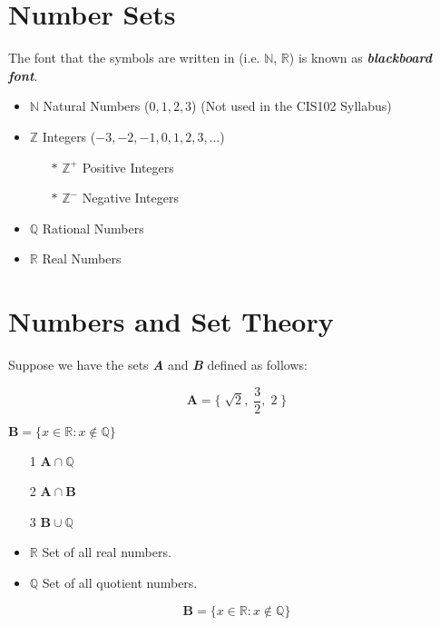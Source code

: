 \documentclass[11pt,a4paper,titlepage,oneside,openany]{article}
\numberwithin{equation}{section}
\numberwithin{algorithm}{section}
\numberwithin{figure}{section}
\numberwithin{table}{section}
\begin{document}
\section{Number Sets}
 The font that the symbols are written in (i.e. $\mathbb{N}$, $\mathbb{R}$) is known as \textit{\textbf{blackboard font}}.
\begin{itemize}
 \item $\mathbb{N}$ Natural Numbers ($0,1,2,3$) 
(Not used in the CIS102 Syllabus)
\item $\mathbb{Z}$ Integers ($-3,-2,-1,0,1,2,3, \ldots$)
\begin{itemize}
\item[$\ast$] $\mathbb{Z}^{+}$ Positive Integers
\item[$\ast$] $\mathbb{Z}^{-}$ Negative Integers
\end{itemize}
\item $\mathbb{Q}$ Rational Numbers
\item $\mathbb{R}$ Real Numbers
\end{itemize}

\section{Numbers and Set Theory}

Suppose we have the sets \textit{\textbf{A}} and \textbf{\textit{B}} defined as follows:

\[ \boldsymbol{A} = \{\; \sqrt{2},\; \frac{3}{2},\; 2\; \}\]
\begin{center}
$ \boldsymbol{B} = \{ x \in \mathbb{R} :  x \notin  \mathbb{Q} \}  $
\end{center}

\begin{itemize}
\item[1] $\boldsymbol{A} \cap \mathbb{Q}$
\item[2] $\boldsymbol{A} \cap \boldsymbol{B}$
\item[3] $\boldsymbol{B} \cup \mathbb{Q}$
\end{itemize}



\begin{itemize}
\item $ \mathbb{R}$ Set of all real numbers.
\item $ \mathbb{Q}$ Set of all quotient numbers.
\end{itemize}

\[ \boldsymbol{B} = \{ x \in \mathbb{R} :  x \notin  \mathbb{Q} \}\]  
\end{document}
